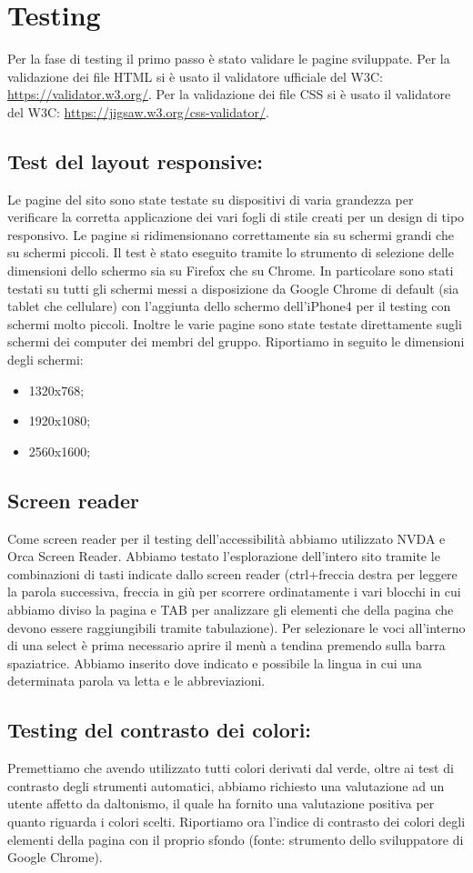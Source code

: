 \section{Testing}
Per la fase di testing il primo passo è stato validare le pagine sviluppate.
Per la validazione dei file HTML si è usato il validatore ufficiale del W3C: \url{https://validator.w3.org/}.
Per la validazione dei file CSS si è usato il validatore del W3C: \url{https://jigsaw.w3.org/css-validator/}.

\subsection{Test del layout responsive:} Le pagine del sito sono state testate su dispositivi di varia grandezza per verificare la corretta applicazione dei vari fogli di stile creati per un design di tipo responsivo. Le pagine si ridimensionano correttamente sia su schermi grandi che su schermi piccoli. Il test è stato eseguito tramite lo strumento di selezione delle dimensioni dello schermo sia su Firefox che su Chrome. In particolare sono stati testati su tutti gli schermi messi a disposizione da Google Chrome di default (sia tablet che cellulare) con l'aggiunta dello schermo dell'iPhone4 per il testing con schermi molto piccoli. Inoltre le varie pagine sono state testate direttamente sugli schermi dei computer dei membri del gruppo. Riportiamo in seguito le dimensioni degli schermi:
\begin{itemize}
    \item 1320x768;
    \item 1920x1080;
    \item 2560x1600;
\end{itemize}

\subsection{Screen reader} Come screen reader per il testing dell'accessibilità abbiamo utilizzato NVDA e Orca Screen Reader. Abbiamo testato l'esplorazione dell'intero sito tramite le combinazioni di tasti indicate dallo screen reader (ctrl+freccia destra per leggere la parola successiva, freccia in giù per scorrere ordinatamente i vari blocchi in cui abbiamo diviso la pagina e TAB per analizzare gli elementi che della pagina che devono essere raggiungibili tramite tabulazione). Per selezionare le voci all'interno di una select è prima necessario aprire il menù a tendina premendo sulla barra spaziatrice. Abbiamo inserito dove indicato e possibile la lingua in cui una determinata parola va letta e le abbreviazioni.

\subsection{Testing del contrasto dei colori:}
Premettiamo che avendo utilizzato tutti colori derivati dal verde, oltre ai test di contrasto degli strumenti automatici, abbiamo richiesto una valutazione ad un utente affetto da daltonismo, il quale ha fornito una valutazione positiva per quanto riguarda i colori scelti.
Riportiamo ora l'indice di contrasto dei colori degli elementi della pagina con il proprio sfondo (fonte: strumento dello sviluppatore di Google Chrome).
